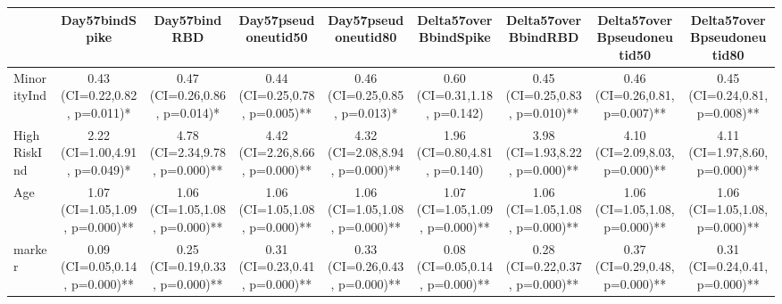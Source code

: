 \begin{tabular}{lcccccccc}
   \hline  &Day57bindSpike& Day57bindRBD& Day57pseudoneutid50& Day57pseudoneutid80& Delta57overBbindSpike& Delta57overBbindRBD& Delta57overBpseudoneutid50& Delta57overBpseudoneutid80\\ 
\hline
MinorityInd & 0.43 (CI=0.22,0.82, p=0.011)* & 0.47 (CI=0.26,0.86, p=0.014)* & 0.44 (CI=0.25,0.78, p=0.005)** & 0.46 (CI=0.25,0.85, p=0.013)* & 0.60 (CI=0.31,1.18, p=0.142) & 0.45 (CI=0.25,0.83, p=0.010)** & 0.46 (CI=0.26,0.81, p=0.007)** & 0.45 (CI=0.24,0.81, p=0.008)** \\ 
  HighRiskInd & 2.22 (CI=1.00,4.91, p=0.049)* & 4.78 (CI=2.34,9.78, p=0.000)** & 4.42 (CI=2.26,8.66, p=0.000)** & 4.32 (CI=2.08,8.94, p=0.000)** & 1.96 (CI=0.80,4.81, p=0.140) & 3.98 (CI=1.93,8.22, p=0.000)** & 4.10 (CI=2.09,8.03, p=0.000)** & 4.11 (CI=1.97,8.60, p=0.000)** \\ 
  Age & 1.07 (CI=1.05,1.09, p=0.000)** & 1.06 (CI=1.05,1.08, p=0.000)** & 1.06 (CI=1.05,1.08, p=0.000)** & 1.06 (CI=1.05,1.08, p=0.000)** & 1.07 (CI=1.05,1.09, p=0.000)** & 1.06 (CI=1.05,1.08, p=0.000)** & 1.06 (CI=1.05,1.08, p=0.000)** & 1.06 (CI=1.05,1.08, p=0.000)** \\ 
  marker & 0.09 (CI=0.05,0.14, p=0.000)** & 0.25 (CI=0.19,0.33, p=0.000)** & 0.31 (CI=0.23,0.41, p=0.000)** & 0.33 (CI=0.26,0.43, p=0.000)** & 0.08 (CI=0.05,0.14, p=0.000)** & 0.28 (CI=0.22,0.37, p=0.000)** & 0.37 (CI=0.29,0.48, p=0.000)** & 0.31 (CI=0.24,0.41, p=0.000)** \\ 
   \hline
\end{tabular}

